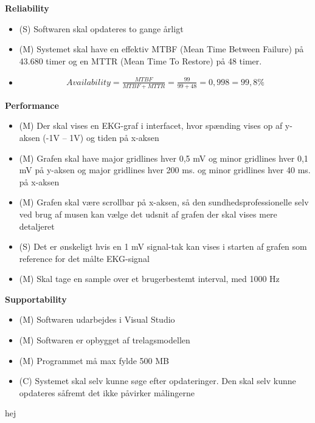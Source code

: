\textbf{Reliability}
\begin{itemize}
	\item (S) Softwaren skal opdateres to gange årligt
	\item (M) Systemet skal have en effektiv MTBF (Mean Time Between Failure) på 43.680 timer og en MTTR (Mean Time To Restore) på 48 timer.
	\item  
				\begin{align}
					Availability = \frac{MTBF}{MTBF+MTTR} = \frac{99}{99+48} = 0,998 = 99,8 \%
				\end{align}

\end{itemize}

\textbf{Performance}
\begin{itemize}
	\item (M) Der skal vises en EKG-graf i interfacet, hvor spænding vises op af y-aksen (-1V – 1V) og tiden på x-aksen
	\item (M) Grafen skal have major gridlines hver 0,5 mV og minor gridlines hver 0,1 mV på y-aksen og major gridlines hver 200 ms. og minor gridlines hver 40 ms. på x-aksen
	\item (M) Grafen skal være scrollbar på x-aksen, så den sundhedsprofessionelle selv ved brug af musen kan vælge det udsnit af grafen der skal vises mere detaljeret
	\item (S) Det er ønskeligt hvis en 1 mV signal-tak kan vises i starten af grafen som reference for det målte EKG-signal
	\item (M) Skal tage en sample over et brugerbestemt interval, med 1000 Hz
\end{itemize}

\textbf{Supportability}
\begin{itemize}
	\item (M) Softwaren udarbejdes i Visual Studio
	\item (M) Softwaren er opbygget af trelagsmodellen
	\item (M) Programmet må max fylde 500 MB
	\item (C) Systemet skal selv kunne søge efter opdateringer. Den skal selv kunne opdateres såfremt det ikke påvirker målingerne
\end{itemize}


hej











